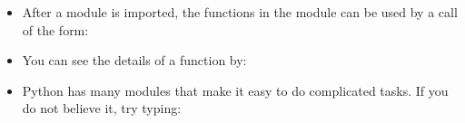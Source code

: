 \documentclass[letterpaper,10pt,english]{sphinxmanual}
\begin{document}
\begin{itemize}
\begin{sphinxVerbatim}[commandchars=\\\{\}]
  
\end{sphinxVerbatim}

\item {} 
After a module is imported, the functions in the module can be
used by a call of the form:

\begin{sphinxVerbatim}[commandchars=\\\{\}]
\end{sphinxVerbatim}

\item {} 
You can see the details of a function by:

\begin{sphinxVerbatim}[commandchars=\\\{\}]
\end{sphinxVerbatim}

\item {} 
Python has many modules that make it easy to do
complicated tasks. If you do not believe it, try typing:

\begin{sphinxVerbatim}[commandchars=\\\{\}]
 
\end{sphinxVerbatim}

\end{itemize}
\end{document}
